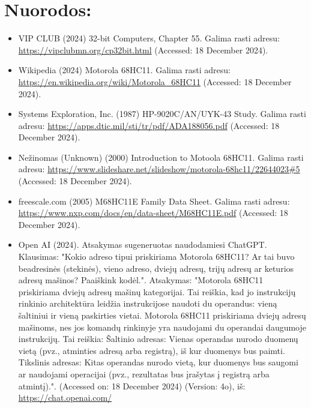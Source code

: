 \documentclass[a4paper,12pt]{article}
\begin{document}
\section{Nuorodos:}
\begin{itemize}
    \item VIP CLUB (2024) 32-bit Computers, Chapter 55. Galima rasti adresu: \url{https://vipclubmn.org/cp32bit.html} (Accessed: 18 December 2024).
    \item Wikipedia (2024) Motorola 68HC11. Galima rasti adresu: \url{https://en.wikipedia.org/wiki/Motorola_68HC11} (Accessed: 18 December 2024).
    \item Systems Exploration, Inc. (1987) HP-9020C/AN/UYK-43 Study. Galima rasti adresu: \url{https://apps.dtic.mil/sti/tr/pdf/ADA188056.pdf} (Accessed: 18 December 2024).
    \item Nežinomas (Unknown) (2000) Introduction to Motoola 68HC11. Galima rasti adresu: \url{https://www.slideshare.net/slideshow/motorola-68hc11/22644023#5} (Accessed: 18 December 2024).
    \item freescale.com (2005) M68HC11E Family Data Sheet. Galima rasti adresu: \url{https://www.nxp.com/docs/en/data-sheet/M68HC11E.pdf} (Accessed: 18 December 2024).
    \item Open AI (2024). Atsakymas sugeneruotas naudodamiesi ChatGPT. Klausimas: "Kokio adreso tipui priskiriama Motorola 68HC11? Ar tai buvo beadresinės (stekinės), vieno adreso, dviejų adresų,  trijų adresų ar keturios adresų mašinos? Paaiškink kodėl.". Atsakymas: "Motorola 68HC11 priskiriama dviejų adresų mašinų kategorijai. Tai reiškia, kad jo instrukcijų rinkinio architektūra leidžia instrukcijose naudoti du operandus: vieną šaltiniui ir vieną paskirties vietai. Motorola 68HC11 priskiriama dviejų adresų mašinoms, nes jos komandų rinkinyje yra naudojami du operandai daugumoje instrukcijų. Tai reiškia: Šaltinio adresas: Vienas operandas nurodo duomenų vietą (pvz., atminties adresą arba registrą), iš kur duomenys bus paimti. Tikslinis adresas: Kitas operandas nurodo vietą, kur duomenys bus saugomi ar naudojami operacijai (pvz., rezultatas bus įrašytas į registrą arba atmintį).". (Accessed on: 18 December 2024) (Version: 4o), iš: \url{https://chat.openai.com/}
\end{itemize}
\end{document}
